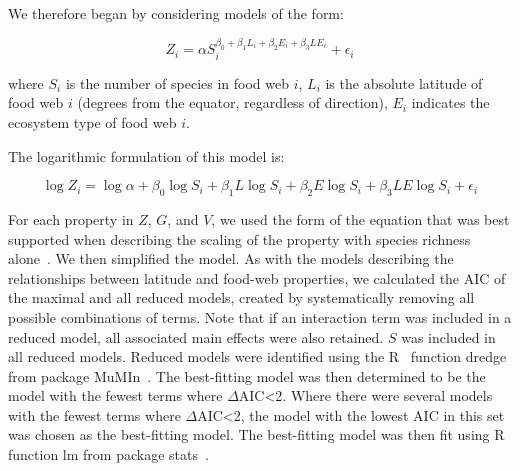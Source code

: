 \documentclass[12pt]{article}
\begin{document}
We therefore began by considering models of the form:

\begin{equation}
\label{PowerLat}
Z_{i}=\alpha S_{i}^{\beta_{0}+\beta_{1}L_{i}+\beta_{2}E_{i}+\beta_{3}LE_{i}} + \epsilon_{i} 
\end{equation}

where $S_{i}$ is the number of species in food web $i$, $L_{i}$ is the absolute latitude of food web $i$ (degrees from the equator, regardless of direction),
$E_{i}$ indicates the ecosystem type of food web $i$.


The logarithmic formulation of this model is:

\begin{equation}
\label{LogLat}
\log{Z_{i}} = \log{\alpha}+\beta_{0}\log{S_{i}} + \beta_{1}L\log{S_{i}} +\beta_{2}E\log{S_{i}} +\beta_{3}LE\log{S_{i}} +\epsilon_{i}
\end{equation}

For each property in $Z$, $G$, and $V$, we used the form of the equation that was best supported
when describing the scaling of the property with species richness alone~\citep{Xiao2011}.
We then simplified the model. As with the models describing the relationships between latitude and food-web
properties, we calculated the AIC of the maximal and all reduced models, created by systematically removing
all possible combinations of terms. Note that if an interaction term was included in a reduced model, all
associated main effects were also retained. $S$ was included in all reduced models. Reduced models were
identified using the R~\citep{R} function dredge from package MuMIn~\citep{MuMIn}. The best-fitting model
was then determined to be the model with the fewest terms where $\Delta$AIC<2. Where there were several
models with the fewest terms where $\Delta$AIC<2, the model with the lowest AIC in this set was chosen as
the best-fitting model. The best-fitting model was then fit using R~\citep{R} function lm from package stats~\citep{stats}.
\end{document}
